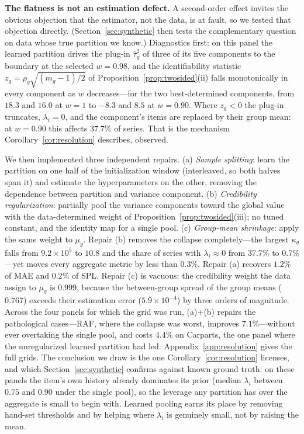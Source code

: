 \documentclass[twocolumn,10pt]{article}
\begin{document}
\textbf{The flatness is not an estimation defect.} A second-order effect
invites the obvious objection that the estimator, not the data, is at
fault, so we tested that objection directly. (Section~\ref{sec:synthetic}
then tests the complementary question on data whose true partition we
know.)
Diagnostics first: on this panel the learned partition drives the plug-in
$\hat\tau_g^2$ of three of its five components to the boundary at the
selected $w=0.98$, and the identifiability statistic
$z_g=\rho_g\sqrt{(m_g-1)/2}$ of
Proposition~\ref{prop:twosided}(ii) falls monotonically in every
component as $w$ decreases---for the two best-determined components,
from $18.3$ and $16.0$ at $w{=}1$ to $-8.3$ and $8.5$ at $w{=}0.90$.
Where $z_g<0$ the plug-in truncates, $\lambda_i=0$, and the component's
items are replaced by their group mean: at $w{=}0.90$ this affects
$37.7\%$ of series. That is the mechanism
Corollary~\ref{cor:resolution} describes, observed.

We then implemented three independent repairs. (a) \emph{Sample
splitting}: learn the partition on one half of the initialization window
(interleaved, so both halves span it) and estimate the hyperparameters on
the other, removing the dependence between partition and variance
component. (b) \emph{Credibility regularization}: partially pool the
variance components toward the global value with the data-determined
weight of Proposition~\ref{prop:twosided}(iii); no tuned constant, and
the identity map for a single pool. (c) \emph{Group-mean shrinkage}:
apply the same weight to $\mu_g$. Repair (b) removes the collapse
completely---the largest $\kappa_g$ falls from $9.2\times10^{5}$ to
$10.8$ and the share of series with $\lambda_i\!\approx\!0$ from
$37.7\%$ to $0.7\%$---yet moves every aggregate metric by less than
$0.3\%$. Repair (a) recovers $1.2\%$ of MAE and $0.2\%$ of SPL. Repair
(c) is vacuous: the credibility weight the data assign to $\mu_g$ is
$0.999$, because the between-group spread of the group means
($0.767$) exceeds their estimation error ($5.9\times10^{-4}$) by three
orders of magnitude. Across the four panels for which the grid was run,
(a)+(b) repairs the pathological cases---RAF, where the collapse was
worst, improves $7.1\%$---without ever overtaking the single pool, and
costs $4.4\%$ on Carparts, the one panel where the unregularized learned
partition had led. Appendix~\ref{app:resolution} gives the full grids.
The conclusion we draw is the one
Corollary~\ref{cor:resolution} licenses, and which
Section~\ref{sec:synthetic} confirms against known ground truth: on these
panels the item's own history already dominates its prior (median
$\lambda_i$ between $0.75$ and $0.90$ under the single pool), so the
leverage any partition has over the aggregate is small to begin with.
Learned pooling earns its place by removing hand-set thresholds and by
helping where $\lambda_i$ is genuinely small, not by raising the mean.
\end{document}
